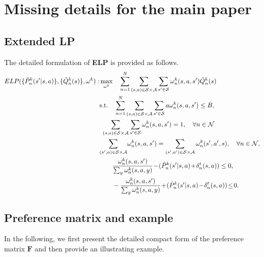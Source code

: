 \documentclass{article} %
\newcommand{\bF}{\mathbf{F}}
\newcommand{\cA}{\mathcal{A}}
\newcommand{\cS}{\mathcal{S}}
\newcommand{\cN}{\mathcal{N}}
\begin{document}
{\section{Missing details for the main paper}



\subsection{Extended LP}\label{sec:extened_LP}
The detailed formulation of \textbf{ELP} is provided as follows.
\begin{align}\label{eq:extend_LP}
{\textbf{ELP}}(\{\tilde{P}_n^k(s^\prime|s,a)\}, \{\tilde{Q}^k_n(s)\},\omega^k):& \max_{\omega^k}\quad \sum_{n=1}^{N}\sum_{(s,a)\in\cS\times\cA} \sum_{s^\prime\in\cS}\omega_n^k(s,a, s^\prime)\tilde{Q}^k_n(s)\nonumber\allowdisplaybreaks\\
&\mbox{s.t.}\quad  \sum_{n=1}^{N}\sum_{(s,a)\in\cS\times\cA} \sum_{s^\prime\in\cS} a\omega^k_n(s,a,s^\prime)\leq B,\nonumber\allowdisplaybreaks\\
&~\sum_{(s,a)\in\cS\times\cA} \sum_{s^\prime\in\cS} \omega^k_n(s,a, s^\prime)=1, \quad \forall n\in\cN\nonumber\allowdisplaybreaks\\
&{\sum_{( s^\prime, a)\in\cS\times\cA}} \omega^k_n(s,a, s^\prime)=\sum_{(s^\prime, a^\prime)\in\cS\times\cA}\omega^k_n(s^\prime, a^\prime, s),\quad\forall { n\in\cN},
\nonumber\allowdisplaybreaks\\ 
&\qquad\frac{\omega^k_n(s,a,s^\prime)}{\sum_y \omega^k_n(s,a,y)}\!-\!(\hat{P}^k_n(s^\prime|s,a)\!+\!\delta^t_n(s,a))\leq 0,\nonumber\allowdisplaybreaks\\
&\qquad-\frac{\omega^k_n(s,a,s^\prime)}{\sum_y \omega^k_n(s,a,y)}\!+\!(\hat{P}^k_n(s^\prime|s,a)\!-\!\delta^t_n(s,a))\!\leq\! 0.
\end{align}

\subsection{Preference matrix and example}\label{sec:examples}
In the following, we first present the detailed compact form of the preference matrix $\bF$ and then provide an illustrating example. 

}
\end{document}
